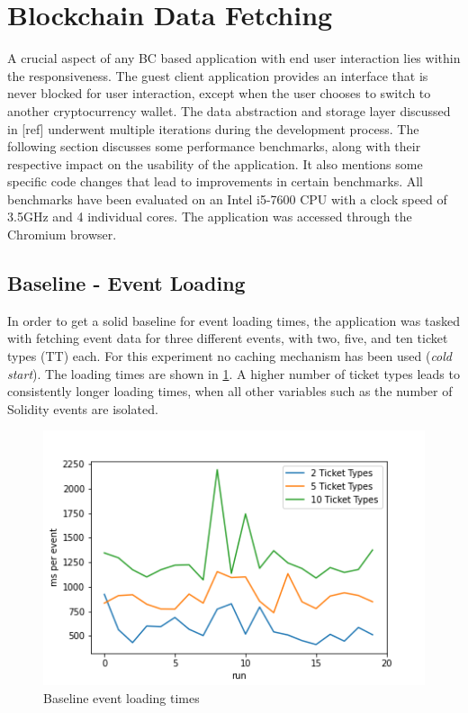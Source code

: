 \section{Blockchain Data Fetching}\label{section:data-model}

A crucial aspect of any BC based application with end user interaction lies within the responsiveness. The guest client application provides an interface that is never blocked for user interaction, except when the user chooses to switch to another cryptocurrency wallet. The data abstraction and storage layer discussed in [ref] underwent multiple iterations during the development process. The following section discusses some performance benchmarks, along with their respective impact on the usability of the application. It also mentions some specific code changes that lead to improvements in certain benchmarks. All benchmarks have been evaluated on an Intel i5-7600 CPU with a clock speed of 3.5GHz and 4 individual cores. The application was accessed through the Chromium browser.

\subsection{Baseline - Event Loading}\label{section:bl-events}
In order to get a solid baseline for event loading times, the application was tasked with fetching event data for three different events, with two, five, and ten ticket types (TT) each. For this experiment no caching mechanism has been used (\textit{cold start}). The loading times are shown in \ref{img:baseline1}. A higher number of ticket types leads to consistently longer loading times, when all other variables such as the number of Solidity events are isolated.

\begin{figure}[H]
    \centering
    \includegraphics[width=14cm]{images/plot1.png}
    \caption{Baseline event loading times \protect\footnotemark}
    \label{img:baseline1}
\end{figure}

